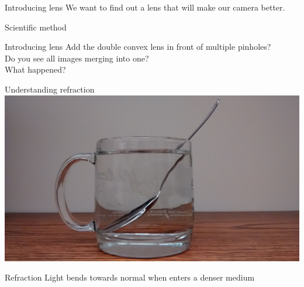 \begin{frame}{Introducing lens}
  We want to find out a lens that will make our camera better.
\end{frame}

\begin{frame}[fragile]{Scientific method}
  
\end{frame}

\begin{frame}{Introducing lens}
  Add the double convex lens in front of multiple pinholes?\\
  \pause
  Do you see all images merging into one?\\
  What happened?
\end{frame}

\begin{frame}{Understanding refraction}
  \centering
  \includegraphics[width=\textwidth]{media/refractionspoon.jpg}
\end{frame}

\begin{frame}{Refraction}
  Light bends towards normal when enters a denser medium \\
  \begin{center}
  \end{center}
\end{frame}

